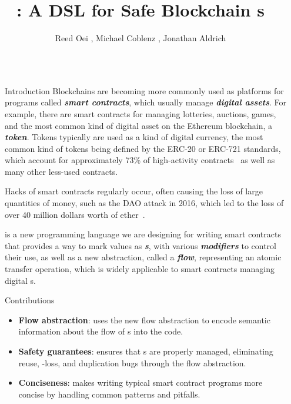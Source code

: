 \documentclass[usenames, dvipsnames, final]{beamer}
\title{\langName: A DSL for Safe Blockchain \AssetTxt{}s}
\author{Reed Oei \inst{1}, Michael Coblenz \inst{2}, Jonathan Aldrich \inst{2}}
\institute[shortinst]{\inst{1} University of Illinois \samelineand \inst{2} Carnegie Mellon University}
\newlength{\sepwidth}
\newlength{\colwidth}
\newcommand{\separatorcolumn}{\begin{column}{\sepwidth}\end{column}}
\newcommand{\term}[1]{\textbf{\emph{#1}}}
\begin{document}
\begin{frame}[t]
\begin{columns}[t]
\separatorcolumn

\begin{column}{\colwidth}

  \begin{block}{Introduction}
      Blockchains are becoming more commonly used as platforms for programs called \term{smart contracts}, which usually manage \term{digital assets}.
      For example, there are smart contracts for managing lotteries, auctions, games, and the most common kind of digital asset on the Ethereum blockchain, a \term{token}.
      Tokens typically are used as a kind of digital currency, the most common kind of tokens being defined by the ERC-20 or ERC-721 standards, which account for approximately 73\% of high-activity contracts~\cite{OlivaEtAl2019} as well as many other less-used contracts.

      Hacks of smart contracts regularly occur, often causing the loss of large quantities of money, such as the DAO attack in 2016, which led to the loss of over 40 million dollars worth of ether~\cite{DAO}.

      \textcolor{softRed}{\textbf{\langName}} is a new programming language we are designing for writing smart contracts that provides a way to mark values as \term{\assetTxt{}s}, with various \term{modifiers} to control their use, as well as a new abstraction, called a \term{flow}, representing an atomic transfer operation, which is widely applicable to smart contracts managing digital \assetTxt{}s.
  \end{block}

    \begin{alertblock}{Contributions}
      \begin{itemize}
          \item \textbf{Flow abstraction}: \langName uses the new flow abstraction to encode semantic information about the flow of \assetTxt{}s into the code.
          \item \textbf{Safety guarantees}: \langName ensures that \assetTxt{}s are properly managed, eliminating reuse, \assetTxt-loss, and duplication bugs through the flow abstraction.
          \item \textbf{Conciseness}: \langName makes writing typical smart contract programs more concise by handling common patterns and pitfalls.
      \end{itemize}
    \end{alertblock}
\end{column}


\end{columns}
\end{frame}
\end{document}
